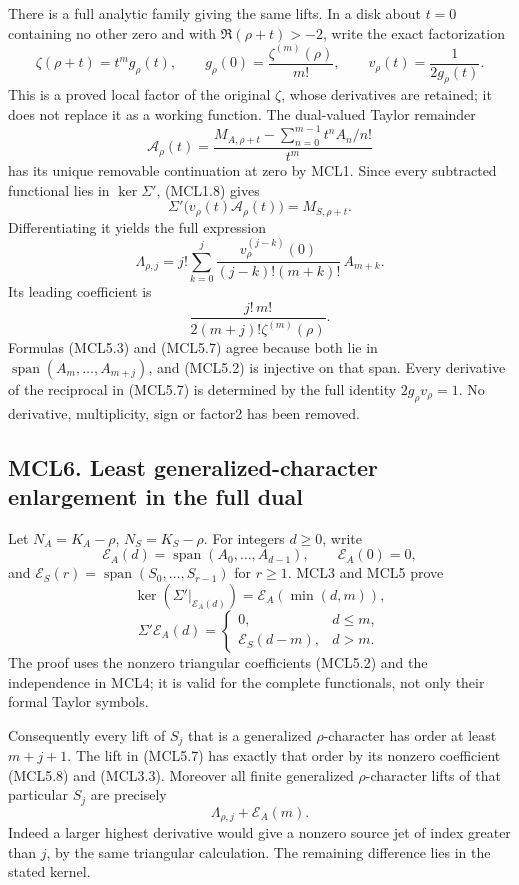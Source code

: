 There is a full analytic family giving the same lifts. In a disk about
\(t=0\) containing no other zero and with \(\Re(\rho+t)>-2\), write the
exact factorization \[
 \zeta(\rho+t)=t^m g_\rho(t),\qquad
 g_\rho(0)=\frac{\zeta^{(m)}(\rho)}{m!},\qquad
 v_\rho(t)=\frac1{2g_\rho(t)}.
 \tag{MCL5.5}
\] This is a proved local factor of the original \(\zeta\), whose
derivatives are retained; it does not replace it as a working function.
The dual-valued Taylor remainder \[
 \mathcal A_\rho(t)=
 \frac{M_{A,\rho+t}
       -\sum_{n=0}^{m-1}t^nA_n/n!}{t^m}
\] has its unique removable continuation at zero by MCL1. Since every
subtracted functional lies in \(\ker\Sigma'\), (MCL1.8) gives \[
 \boxed{\Sigma'\big(v_\rho(t)\mathcal A_\rho(t)\big)
        =M_{S,\rho+t}.}
 \tag{MCL5.6}
\] Differentiating it yields the full expression \[
 \boxed{
 \Lambda_{\rho,j}
 =j!\sum_{k=0}^j
 \frac{v_\rho^{(j-k)}(0)}
      {(j-k)!(m+k)!}\,A_{m+k}.
 }
 \tag{MCL5.7}
\] Its leading coefficient is \[
 \frac{j!\,m!}{2(m+j)!\zeta^{(m)}(\rho)}.
 \tag{MCL5.8}
\] Formulas (MCL5.3) and (MCL5.7) agree because both lie in
\(\operatorname{span}(A_m,\ldots,A_{m+j})\), and (MCL5.2) is injective
on that span. Every derivative of the reciprocal in (MCL5.7) is
determined by the full identity \(2g_\rho v_\rho=1\). No derivative,
multiplicity, sign or factor2 has been removed.

\subsection{MCL6. Least generalized-character enlargement in the full
dual}\label{mcl6.-least-generalized-character-enlargement-in-the-full-dual}

Let \(N_A=K_A-\rho\), \(N_S=K_S-\rho\). For integers \(d\ge0\), write \[
 \mathcal E_A(d)=\operatorname{span}(A_0,\ldots,A_{d-1}),
 \qquad \mathcal E_A(0)=0,
\] and \(\mathcal E_S(r)=\operatorname{span}(S_0,\ldots,S_{r-1})\) for
\(r\ge1\). MCL3 and MCL5 prove \[
 \ker\!\left(\Sigma'|_{\mathcal E_A(d)}\right)
   =\mathcal E_A(\min(d,m)),
\] \[
 \Sigma'\mathcal E_A(d)=
 \begin{cases}0,&d\le m,\\
 \mathcal E_S(d-m),&d>m.
 \end{cases}
 \tag{MCL6.1}
\] The proof uses the nonzero triangular coefficients (MCL5.2) and the
independence in MCL4; it is valid for the complete functionals, not only
their formal Taylor symbols.

Consequently every lift of \(S_j\) that is a generalized
\(\rho\)-character has order at least \(m+j+1\). The lift in (MCL5.7)
has exactly that order by its nonzero coefficient (MCL5.8) and (MCL3.3).
Moreover all finite generalized \(\rho\)-character lifts of that
particular \(S_j\) are precisely \[
 \boxed{
 \Lambda_{\rho,j}+\mathcal E_A(m).
 }
 \tag{MCL6.2}
\] Indeed a larger highest derivative would give a nonzero source jet of
index greater than \(j\), by the same triangular calculation. The
remaining difference lies in the stated kernel.


